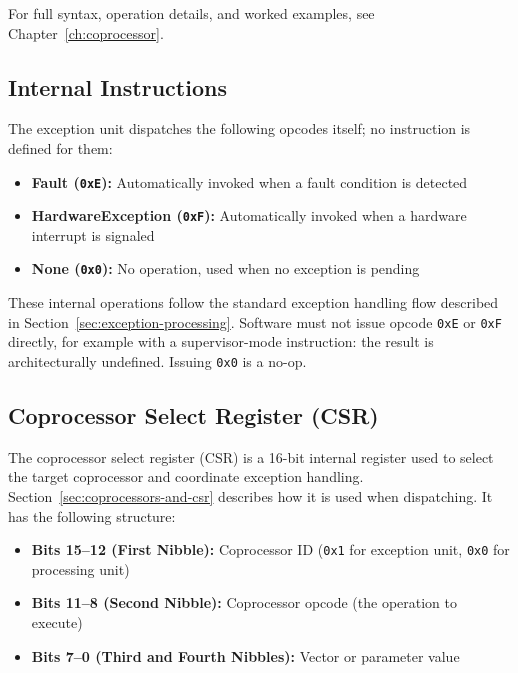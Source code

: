 For full syntax, operation details, and worked examples, see Chapter~\ref{ch:coprocessor}.

\subsection{Internal Instructions}

The exception unit dispatches the following opcodes itself; no instruction is defined for them:

\begin{itemize}
	\item \textbf{Fault (\texttt{0xE}):} Automatically invoked when a fault condition is detected
	\item \textbf{HardwareException (\texttt{0xF}):} Automatically invoked when a hardware interrupt is signaled
	\item \textbf{None (\texttt{0x0}):} No operation, used when no exception is pending
\end{itemize}

These internal operations follow the standard exception handling flow described in
Section~\ref{sec:exception-processing}. Software must not issue opcode \texttt{0xE} or \texttt{0xF} directly, for
example with a supervisor-mode  instruction: the result is architecturally undefined. Issuing
\texttt{0x0} is a no-op.

\subsection{Coprocessor Select Register (CSR)}
\label{sec:coprocessor-select-register}

The coprocessor select register (CSR) is a 16-bit internal register used to select the target coprocessor and
coordinate exception handling. Section~\ref{sec:coprocessors-and-csr} describes how it is used when dispatching. It has
the following structure:

\begin{itemize}
	\item \textbf{Bits 15--12 (First Nibble):} Coprocessor ID (\texttt{0x1} for exception unit, \texttt{0x0} for processing
	      unit)
	\item \textbf{Bits 11--8 (Second Nibble):} Coprocessor opcode (the operation to execute)
	\item \textbf{Bits 7--0 (Third and Fourth Nibbles):} Vector or parameter value
\end{itemize}

